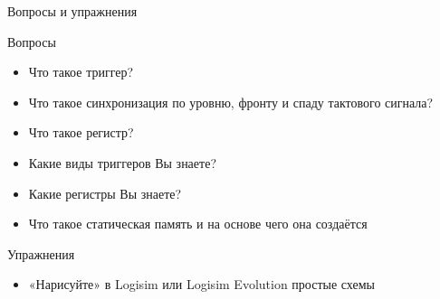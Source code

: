 \documentclass[xetex,aspectratio=43]{beamer}
\begin{document}
\begin{frame}{Вопросы и упражнения}

    \begin{block}{Вопросы}
        \begin{itemize}
            \tightlist
            \item
            Что такое триггер?
            \item
            Что такое синхронизация по уровню, фронту и спаду тактового сигнала?
            \item
            Что такое регистр?
            \item
            Какие виды триггеров Вы знаете?
            \item
            Какие регистры Вы знаете?
            \item
            Что такое статическая память и на основе чего она создаётся
        \end{itemize}
    \end{block}

    \begin{block}{Упражнения}
        \begin{itemize}
            \tightlist
            \item
            «Нарисуйте» в Logisim или Logisim Evolution простые схемы
        \end{itemize}


    \end{block}
\end{frame}
\end{document}
